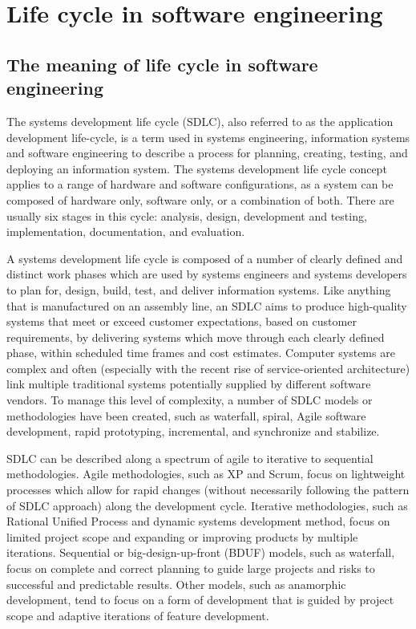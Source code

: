 \documentclass[a4paper]{report}
\begin{document}
\section{Life cycle in software engineering}
\subsection{The meaning of life cycle in software engineering}
The systems development life cycle (SDLC), also referred to as the application development life-cycle, is a term used in systems engineering, information systems and software engineering to describe a process for planning, creating, testing, and deploying an information system. The systems development life cycle concept applies to a range of hardware and software configurations, as a system can be composed of hardware only, software only, or a combination of both. There are usually six stages in this cycle: analysis, design, development and testing, implementation, documentation, and evaluation.
\par
A systems development life cycle is composed of a number of clearly defined and distinct work phases which are used by systems engineers and systems developers to plan for, design, build, test, and deliver information systems. Like anything that is manufactured on an assembly line, an SDLC aims to produce high-quality systems that meet or exceed customer expectations, based on customer requirements, by delivering systems which move through each clearly defined phase, within scheduled time frames and cost estimates. Computer systems are complex and often (especially with the recent rise of service-oriented architecture) link multiple traditional systems potentially supplied by different software vendors. To manage this level of complexity, a number of SDLC models or methodologies have been created, such as waterfall, spiral, Agile software development, rapid prototyping, incremental, and synchronize and stabilize.
\par
SDLC can be described along a spectrum of agile to iterative to sequential methodologies. Agile methodologies, such as XP and Scrum, focus on lightweight processes which allow for rapid changes (without necessarily following the pattern of SDLC approach) along the development cycle. Iterative methodologies, such as Rational Unified Process and dynamic systems development method, focus on limited project scope and expanding or improving products by multiple iterations. Sequential or big-design-up-front (BDUF) models, such as waterfall, focus on complete and correct planning to guide large projects and risks to successful and predictable results. Other models, such as anamorphic development, tend to focus on a form of development that is guided by project scope and adaptive iterations of feature development.
\end{document}
